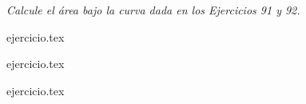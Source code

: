 \vspace{1em}
\noindent \textit{Calcule el área bajo la curva dada en los Ejercicios 91 y 92.}

\begin{enumerate}
    \setcounter{enumi}{90}
    \begin{minipage}{0.45\textwidth}
    {ejercicio.tex}
    \end{minipage}%
    \begin{minipage}{0.45\textwidth}
    {ejercicio.tex}
    \end{minipage}
\end{enumerate}

\vspace{1em}
\begin{enumerate}
    \setcounter{enumi}{92}
    {ejercicio.tex}
\end{enumerate}
